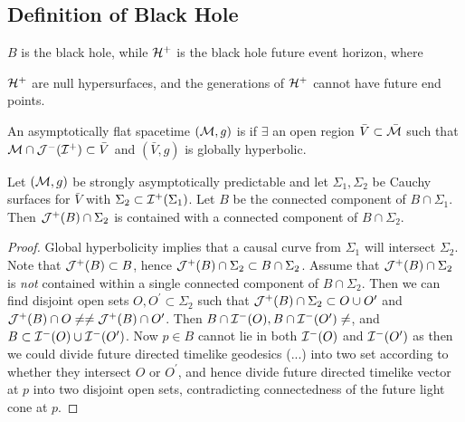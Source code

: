 \documentclass{article}
\begin{document}
\subsection{Definition of Black Hole}
$B$ is the black hole, while $\mathcal{H}^+$ is the black hole future event horizon, where 

$\mathcal{H}^+$ are null hypersurfaces, and the generations of $\mathcal{H}^+$ cannot have future end points. 

\begin{definition}
An asymptotically flat spacetime $(\mathcal{M},g)$ is  if $\exists$ an open region $\bar{V}\subset \bar{\mathcal{M}}$ such that $\mathcal{M}\cap \mathcal{J}^- (\mathcal{I}^+)\subset \bar{V}$ and $(\bar{V},g)$ is globally hyperbolic.
\end{definition}

\begin{theorem}
Let $(\mathcal{M},g)$ be strongly asymptotically predictable and let $\Sigma_1, \Sigma_2$ be Cauchy surfaces for $\bar{V}$ with $\Sigma_2 \subset \mathcal{I}^+(\Sigma_1)$. Let $B$ be the connected component of $B \cap \Sigma_1$. Then $\mathcal{J}^+(B) \cap \Sigma_2$ is contained with a connected component of $B \cap \Sigma_2$. 
\end{theorem}
\begin{proof}
Global hyperbolicity implies that a causal curve from $\Sigma_1$ will intersect $\Sigma_2$. Note that $\mathcal{J}^+(B) \subset B$, hence $\mathcal{J}^+(B) \cap \Sigma_2 \subset B\cap \Sigma_2$. Assume that $\mathcal{J}^+(B)\cap\Sigma_2$ is \emph{not} contained within a single connected component of $B\cap\Sigma_2$. Then we can find disjoint open sets $O,O^\prime \subset \Sigma_2$ such that $\mathcal{J}^+(B) \cap\Sigma_2 \subset O\cup O^\prime$ and $\mc{J}^+(B) \cap O \neq \empty \neq \mc{J}^+(B) \cap O^\prime$. Then $B \cap \mc{I}^-(O), B\cap \mc{I}^-(O^\prime) \neq \empty$, and $B\subset \mathcal{I}^-(O) \cup \mathcal{I}^-(O^\prime)$. Now $p \in B$ cannot lie in both $\mathcal{I}^-(O)$ and $\mathcal{I}^-(O^\prime)$ as then we could divide future directed timelike geodesics (...) into two set according to whether they intersect $O$ or $O^\prime$, and hence divide future directed timelike vector at $p$ into two disjoint open sets, contradicting connectedness of the future light cone at $p$. 
\end{proof}
\end{document}
